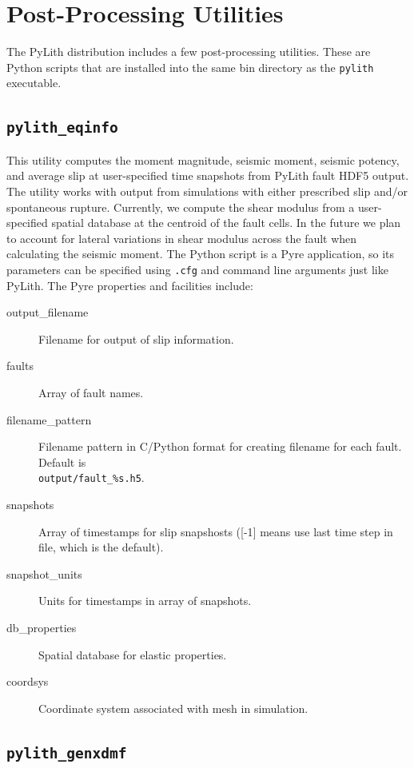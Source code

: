 \section{Post-Processing Utilities}

The PyLith distribution includes a few post-processing utilities.
These are Python scripts that are installed into the same bin directory
as the \texttt{pylith} executable.


\subsection{\texttt{pylith\_eqinfo}}

This utility computes the moment magnitude, seismic moment, seismic
potency, and average slip at user-specified time snapshots from PyLith
fault HDF5 output. The utility works with output from simulations
with either prescribed slip and/or spontaneous rupture. Currently,
we compute the shear modulus from a user-specified spatial database
at the centroid of the fault cells. In the future we plan to account
for lateral variations in shear modulus across the fault when calculating
the seismic moment. The Python script is a Pyre application, so its
parameters can be specified using \texttt{.cfg} and command line arguments
just like PyLith. The Pyre properties and facilities include:
\begin{description}
\item [{output\_filename}] Filename for output of slip information.
\item [{faults}] Array of fault names.
\item [{filename\_pattern}] Filename pattern in C/Python format for creating
filename for each fault. Default is\\
\texttt{output/fault\_\%s.h5}.
\item [{snapshots}] Array of timestamps for slip snapshosts ({[}-1{]} means
use last time step in file, which is the default).
\item [{snapshot\_units}] Units for timestamps in array of snapshots.
\item [{db\_properties}] Spatial database for elastic properties.
\item [{coordsys}] Coordinate system associated with mesh in simulation.
\end{description}

\subsection{\texttt{\label{sub:pylith_genxdmf}pylith\_genxdmf}}

